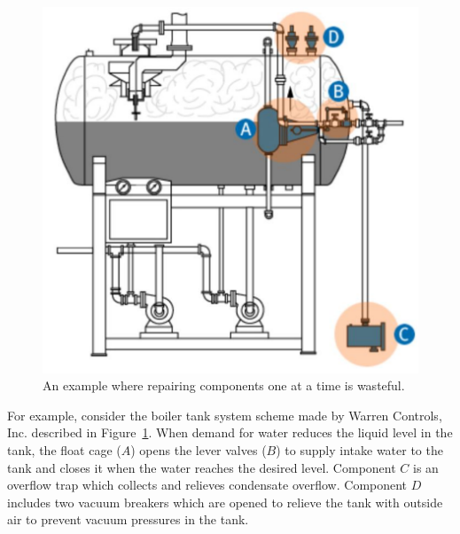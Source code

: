 \documentclass[review]{elsarticle}
\begin{document}
\begin{figure}{}%
\begin{center}
  \includegraphics[width=0.9\columnwidth]{system_example.pdf}
  \caption{An example where repairing components one at a time is wasteful.}
  \label{fig:simple-example}
\end{center}
\end{figure}
%
%
For example, consider the boiler tank system scheme made by Warren Controls, Inc. described in Figure~\ref{fig:simple-example}. When demand for water reduces the liquid level in the tank, the float cage ($A$) opens the lever valves ($B$) to supply intake water to the tank and closes it when the water reaches the desired level. Component $C$ is an overflow trap which collects and relieves condensate overflow. Component $D$ includes two vacuum breakers which are opened to relieve the tank with outside air to prevent vacuum pressures in the tank.
\end{document}
